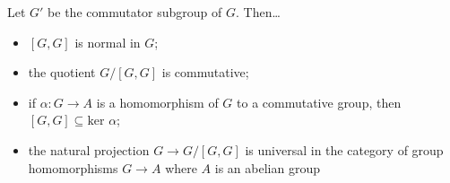 \begin{proposition}
\label{commutatorprop}
Let $G'$ be the commutator subgroup of $G$. Then\dots
\begin{itemize}
  \item $[G,G]$ is normal in $G$;
  \item the quotient $G / [G,G]$ is commutative;
  \item if $\alpha : G \rightarrow A$ is a homomorphism of $G$ to a commutative group, then $[G,G] \subseteq \textrm{ker } \alpha$;
  \item the natural projection $G \rightarrow G/[G,G]$ is universal in the category of group homomorphisms $G \rightarrow A$ where $A$ is an abelian group
\end{itemize}
\end{proposition}